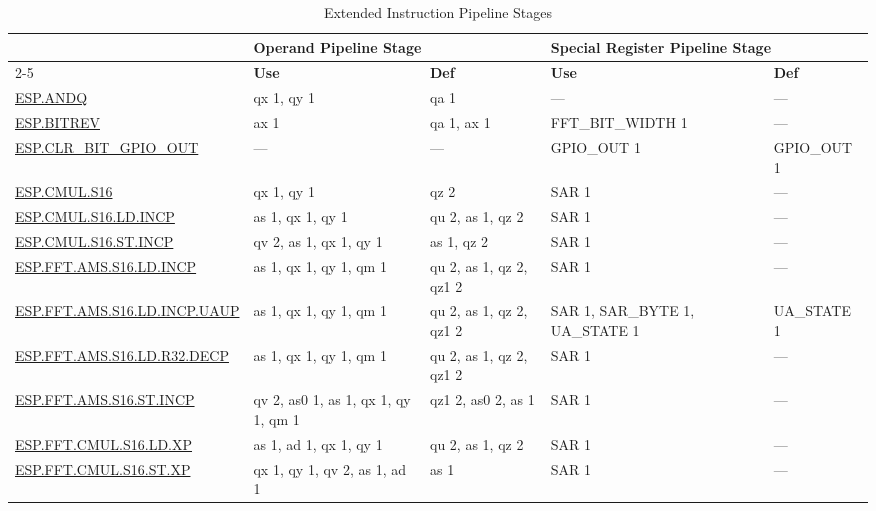 
\begin{longtable}[c]{|l|m{2.5cm}|m{2.5cm}|m{2.5cm}|m{2.5cm}|}
    \caption{Extended Instruction Pipeline Stages}
    \label{tab:pie_inst_pipelining}\\
    \hline
    \rowcolor{lightgray}
     & \multicolumn{2}{l|}{\textbf{Operand Pipeline Stage}} & \multicolumn{2}{l|}{\textbf{Special Register Pipeline Stage}} \\\cline{2-5}
    \rowcolor{lightgray}
    \multirow{-2}{1in}{\textbf{Instruction}} & \textbf{Use} & \textbf{Def} & \textbf{Use} & \textbf{Def} \\\hline
    \hyperref[instruction:ESPANDQ]{ESP.ANDQ} & qx 1, qy 1 & qa 1 & — & — \\\hline
    \hyperref[instruction:ESPBITREV]{ESP.BITREV} & ax 1 & qa 1, ax 1 & FFT\_BIT\_WIDTH 1 & — \\\hline
    \hyperref[instruction:ESPCLRBITGPIOOUT]{ESP.CLR\_BIT\_GPIO\_OUT} & — & — & GPIO\_OUT 1 & GPIO\_OUT 1 \\\hline
    \hyperref[instruction:ESPCMULS16]{ESP.CMUL.S16} & qx 1, qy 1 & qz 2 & SAR 1 & — \\\hline
    \hyperref[instruction:ESPCMULS16LDINCP]{ESP.CMUL.S16.LD.INCP} & as 1, qx 1, qy 1 & qu 2, as 1, qz 2 & SAR 1 & — \\\hline
    \hyperref[instruction:ESPCMULS16STINCP]{ESP.CMUL.S16.ST.INCP} & qv 2, as 1, qx 1, qy 1 & as 1, qz 2 & SAR 1 & — \\\hline
    \hyperref[instruction:ESPFFTAMSS16LDINCP]{ESP.FFT.AMS.S16.LD.INCP} & as 1, qx 1, qy 1, qm 1 & qu 2, as 1, qz 2, qz1 2 & SAR 1 & — \\\hline
    \hyperref[instruction:ESPFFTAMSS16LDINCPUAUP]{ESP.FFT.AMS.S16.LD.INCP.UAUP} & as 1, qx 1, qy 1, qm 1 & qu 2, as 1, qz 2, qz1 2 & SAR 1, SAR\_BYTE 1, UA\_STATE 1 & UA\_STATE 1\\\hline
    \hyperref[instruction:ESPFFTAMSS16LDR32DECP]{ESP.FFT.AMS.S16.LD.R32.DECP} & as 1, qx 1, qy 1, qm 1 & qu 2, as 1, qz 2, qz1 2 & SAR 1 & — \\\hline
    \hyperref[instruction:ESPFFTAMSS16STINCP]{ESP.FFT.AMS.S16.ST.INCP} & qv 2, as0 1, as 1, qx 1, qy 1, qm 1 & qz1 2, as0 2, as 1 & SAR 1 & — \\\hline
    \hyperref[instruction:ESPFFTCMULS16LDXP]{ESP.FFT.CMUL.S16.LD.XP} & as 1, ad 1, qx 1, qy 1 & qu 2, as 1, qz 2 & SAR 1 & — \\\hline
    \hyperref[instruction:ESPFFTCMULS16STXP]{ESP.FFT.CMUL.S16.ST.XP} & qx 1, qy 1, qv 2, as 1, ad 1 & as 1 & SAR 1 & — \\\hline

\end{longtable}
